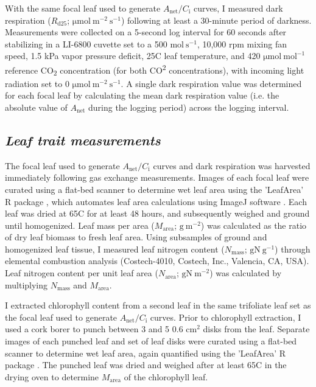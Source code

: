 With the same focal leaf used to generate $A_\mathrm{{net}}/C_\mathrm{i}$ curves, I measured dark respiration ($R_\mathrm{{d25}}$; $\mathrm{\mu mol\ m^{-2}\ s^{-1}}$) following at least a 30-minute period of darkness. Measurements were collected on a 5-second log interval for 60 seconds after stabilizing in a LI-6800 cuvette set to a 500 $\mathrm{mol\ s^{-1}}$, 10,000 rpm mixing fan speed, 1.5 kPa vapor pressure deficit, 25\textdegree{}C leaf temperature, and 420 $\mathrm{\mu mol\ mol^{-1}}$ reference CO\textsubscript{2} concentration (for both CO\textsuperscript{2} concentrations), with incoming light radiation set to 0 $\mathrm{\mu mol\ m^{-2}\ s^{-1}}$. A single dark respiration value was determined for each focal leaf by calculating the mean dark respiration value (i.e. the absolute value of $A_\mathrm{{net}}$ during the logging period) across the logging interval.

\subsection{\textit{Leaf trait measurements}}

The focal leaf used to generate $A_\mathrm{{net}}/C_\mathrm{i}$ curves and dark respiration was harvested immediately following gas exchange measurements. Images of each focal leaf were curated using a flat-bed scanner to determine wet leaf area using the 'LeafArea' R package , which automates leaf area calculations using ImageJ software . Each leaf was dried at 65\textdegree{}C for at least 48 hours, and subsequently weighed and ground until homogenized. Leaf mass per area ($M_\mathrm{area}$; $\mathrm{g\ m^{-2}}$) was calculated as the ratio of dry leaf biomass to fresh leaf area. Using subsamples of ground and homogenized leaf tissue, I measured leaf nitrogen content ($N_\mathrm{mass}$; $\mathrm{g N\ g^{-1}}$) through elemental combustion analysis (Costech-4010, Costech, Inc., Valencia, CA, USA). Leaf nitrogen content per unit leaf area ($N_\mathrm{area}$; $\mathrm{g N\ m^{-2}}$) was calculated by multiplying $N_\mathrm{mass}$ and $M_\mathrm{area}$.

I extracted chlorophyll content from a second leaf in the same trifoliate leaf set as the focal leaf used to generate $A_\mathrm{{net}}/C_\mathrm{i}$ curves. Prior to chlorophyll extraction, I used a cork borer to punch between 3 and 5 0.6 $\mathrm{cm^{2}}$ disks from the leaf. Separate images of each punched leaf and set of leaf disks were curated using a flat-bed scanner to determine wet leaf area, again quantified using the 'LeafArea' R package . The punched leaf was dried and weighed after at least 65\textdegree{}C in the drying oven to determine $M_\mathrm{area}$ of the chlorophyll leaf.
    
